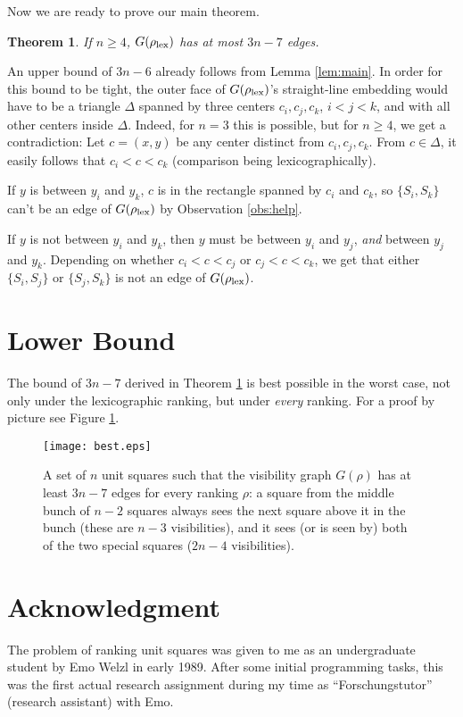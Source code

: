 \documentclass[fleqn,11pt]{article}
\newtheorem{theorem}[definition]{Theorem}
\newcommand{\proof}{\noindent{\bf Proof.} \hspace{1mm}}
\newcommand{\qed}{\hfill\usebox{\proofsymbol}}
\newcommand{\lex}{\rm lex}
\begin{document}
Now we are ready to prove our main theorem.

\begin{theorem}\label{thm:main}
If $n\geq 4$, $G(\rho_{\lex})$ has at most $3n-7$ edges.
\end{theorem}

\proof An upper bound of $3n-6$ already follows from Lemma
\ref{lem:main}. In order for this bound to be tight, the outer face of
$G(\rho_{\lex})$'s straight-line embedding would have to be a
triangle $\Delta$ spanned by three centers
$c_i, c_j,c_k$, $i<j<k$, and with
all other centers inside $\Delta$. Indeed, for $n=3$ this is possible,
but for $n\geq 4$, we get a contradiction: Let $c=(x,y)$ be any center
distinct from $c_i,c_j,c_k$. From $c\in\Delta$, it easily follows that
$c_i< c <c_k$ (comparison being lexicographically). 

If $y$ is between $y_i$ and $y_k$, $c$ is in the rectangle spanned by
$c_i$ and $c_k$, so $\{S_i,S_k\}$ can't be an edge of
$G(\rho_{\lex})$ by Observation \ref{obs:help}.

If $y$ is not between $y_i$ and $y_k$, then $y$ must be between $y_i$ and
$y_j$, \emph{and} between $y_j$ and $y_k$. Depending on whether
$c_i < c < c_j$ or $c_j < c < c_k$, we get that either 
$\{S_i,S_j\}$ or $\{S_j,S_k\}$ is not an edge of $G(\rho_{\lex})$.
\qed

\section{Lower Bound}
The bound of $3n-7$ derived in Theorem \ref{thm:main} is best possible
in the worst case, not only under the lexicographic ranking, but under
\emph{every} ranking. For a proof by picture see Figure \ref{fig:best}.

\begin{figure}[htb]
\begin{center}
\texttt{[image: best.eps]}
\end{center}
\caption{A set of $n$ unit squares such that the visibility graph
  $G(\rho)$ has at least $3n-7$ edges for every ranking $\rho$: a
  square from the middle bunch of $n-2$ squares always sees the next
  square above it in the bunch (these are $n-3$ visibilities), and it
  sees (or is seen by) both of the two special squares ($2n-4$
  visibilities).\label{fig:best}}
\end{figure}
 
\section*{Acknowledgment}
The problem of ranking unit squares was given to me as an
undergraduate student by Emo Welzl in early 1989.  After some initial
programming tasks, this was the first actual research assignment
during my time as ``Forschungstutor'' (research assistant) with Emo.
\end{document}
